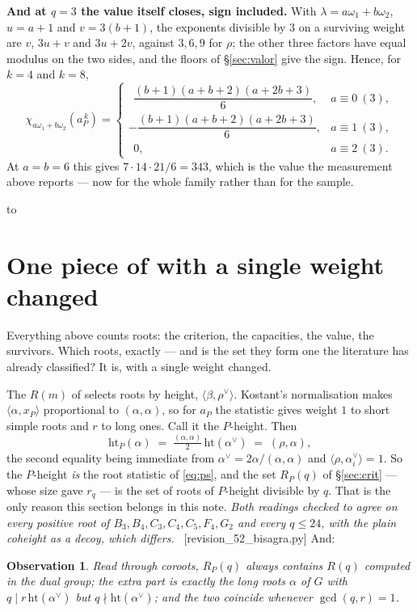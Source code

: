 \documentclass[11pt,a4paper]{article}
\newtheorem{observation}[theorem]{Observation}
\theoremstyle{definition}
\newcommand{\hgt}{\mathrm{ht}}   %
\newcommand{\rhoh}{\rho^{\vee}}
\newcommand{\ver}[1]{\unskip\penalty0\ \textcolor{azul}{\small\textsf{[#1]}}}
\newenvironment{keybox}
  {\par\vspace{9pt}\begin{lrbox}{\fichabox}%
   \begin{minipage}{0.90\textwidth}\vspace{7pt}\setlength{\parskip}{3pt}}
  {\vspace{7pt}\end{minipage}\end{lrbox}%
   \par\noindent\hbox to \textwidth{\hfill
   \textcolor{azul}{\rule[-\dp\fichabox]{3.2pt}{\dimexpr\ht\fichabox+\dp\fichabox\relax}}%
   \colorbox{fondoficha}{\usebox{\fichabox}}\hfill}%
   \par\vspace{9pt}}
\begin{document}
\begin{keybox}
\textbf{And at $q=3$ the value itself closes, sign included.} With $\lambda=a\omega_1+b\omega_2$,
$u=a+1$ and $v=3(b+1)$, the exponents divisible by $3$ on a surviving weight are $v$, $3u+v$ and
$3u+2v$, against $3,6,9$ for $\rho$; the other three factors have equal modulus on the two sides,
and the floors of \S\ref{sec:valor} give the sign. Hence, for $k=4$ and $k=8$,
\[
\chi_{a\omega_1+b\omega_2}(a_P^{\,k})=
\begin{cases}
\ \ \dfrac{(b+1)(a+b+2)(a+2b+3)}{6}, & a\equiv0 \ (3),\\[3mm]
-\dfrac{(b+1)(a+b+2)(a+2b+3)}{6}, & a\equiv1 \ (3),\\[3mm]
\ \ 0, & a\equiv2 \ (3).
\end{cases}
\]
At $a=b=6$ this gives $7\cdot14\cdot21/6=343$, which is the value the measurement above reports ---
now for the whole family rather than for the sample.
\end{keybox}


\section{One piece of \cite{NPP25} with a single weight changed}\label{sec:types}

\noindent Everything above counts roots: the criterion, the capacities, the value, the survivors.
Which roots, exactly --- and is the set they form one the literature has already classified? It
is, with a single weight changed.

The $R(m)$ of \cite{NPP25} selects roots by height, $\langle\beta,\rhoh\rangle$. Kostant's normalisation makes
$\langle\alpha,x_P\rangle$ proportional to $(\alpha,\alpha)$, so for $a_P$ the statistic gives weight
$1$ to short simple roots and $r$ to long ones. Call it the $P$-height. Then
\[
\hgt_P(\alpha) \;=\; \tfrac{(\alpha,\alpha)}{2}\,\hgt(\alpha^\vee) \;=\; (\rho,\alpha),
\]
the second equality being immediate from $\alpha^\vee=2\alpha/(\alpha,\alpha)$ and
$\langle\rho,\alpha_i^\vee\rangle=1$. So the $P$-height \emph{is} the root statistic of
\eqref{eq:ps}, and the set $R_P(q)$ of \S\ref{sec:crit} --- whose size gave $r_q$ --- is the set of
roots of $P$-height divisible by $q$. That is the only reason this section belongs in this note.
\emph{Both readings checked to agree on every positive root of $B_3,B_4,C_3,C_4,C_5,F_4,G_2$ and
every $q\le24$, with the plain coheight as a decoy, which differs.} \ver{revision\_52\_bisagra.py}
And:

\begin{observation}\label{obs:types}
Read through coroots, $R_P(q)$ always contains $R(q)$ computed in the dual group; the extra part is
exactly the long roots $\alpha$ of $G$ with $q \mid r\,\hgt(\alpha^\vee)$ but $q\nmid\hgt(\alpha^\vee)$;
and the two coincide whenever $\gcd(q,r)=1$.
\end{observation}
\end{document}
